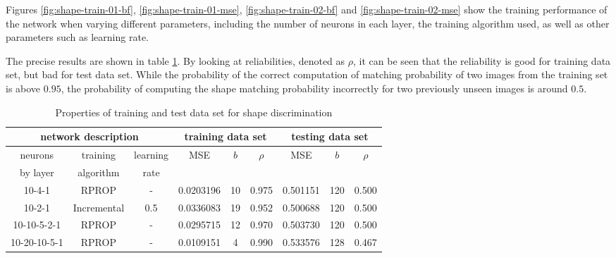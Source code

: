 \documentclass[times, utf8, zavrsni]{fer}
\begin{document}
Figures \ref{fig:shape-train-01-bf}, \ref{fig:shape-train-01-mse},
\ref{fig:shape-train-02-bf} and \ref{fig:shape-train-02-mse} show the training
performance of the network when varying different parameters, including the
number of neurons in each layer, the training algorithm used, as well as other parameters such as
learning rate. 

The precise results are shown in table \ref{table:shape-training-results}. By
looking at reliabilities, denoted as $\rho$, it can be seen that the reliability
is good for training data set, but bad for test data set. While the probability
of the correct computation of matching probability of two images from the
training set is above $0.95$, the probability of computing the shape matching
probability incorrectly for two previously unseen images is around $0.5$.

\begin{table}[h]
\begin{center} {\footnotesize
\begin{tabular}{|c|c|c||c|c|c||c|c|c|}
\hline
\multicolumn{3}{|c||}{network description} & 
\multicolumn{3}{c||}{training data set} & 
\multicolumn{3}{c|}{testing data set} \\
\hline
neurons & training & learning & MSE & $b$ & $\rho$ & MSE & $b$ & $\rho$ \\ 
by layer & algorithm & rate    & & & & & & \\
\hline

10-4-1 & RPROP & - & 
0.0203196 & 10 & 0.975 & 
0.501151 & 120 & 0.500 \\

10-2-1 & Incremental & 0.5 & 
0.0336083 & 19 & 0.952 & 
0.500688 & 120 & 0.500 \\

10-10-5-2-1 & RPROP & - & 
0.0295715 & 12 & 0.970 & 
0.503730 & 120 & 0.500 \\

10-20-10-5-1 & RPROP & - & 
0.0109151 & 4 & 0.990 & 
0.533576 & 128 & 0.467 \\

\hline
\end{tabular} }
\end{center}
\caption{\footnotesize Properties of training and test data set for shape
discrimination}
\label{table:shape-training-results}
\end{table}
\end{document}
